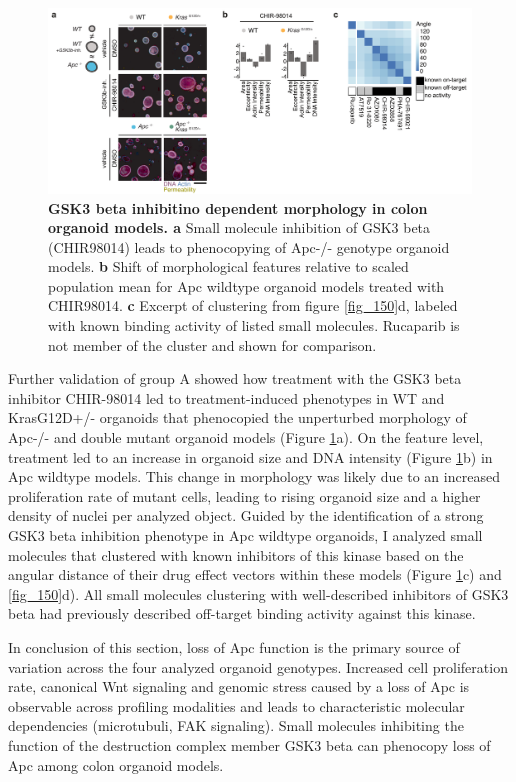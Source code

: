 \begin{flushleft}
\begin{figure}[h]
\centering
\includegraphics[scale=0.75,
                keepaspectratio]{figures/adenomaprofiling/pdf/fig_2_4.pdf}
\caption{\textbf{GSK3 beta inhibitino dependent morphology in colon organoid models. a} Small molecule inhibition of GSK3 beta (CHIR98014) leads to phenocopying of Apc-/- genotype organoid models. \textbf{b} Shift of morphological features relative to scaled population mean for Apc wildtype organoid models treated with CHIR98014. \textbf{c} Excerpt of clustering from figure \ref{fig_150}d, labeled with known binding activity of listed small molecules. Rucaparib is not member of the cluster and shown for comparison.}
\label{fig_185}
\end{figure}
\bigbreak

Further validation of group A showed how treatment with the GSK3 beta inhibitor CHIR-98014 led to treatment-induced phenotypes in WT and KrasG12D+/- organoids that phenocopied the unperturbed morphology of Apc-/- and double mutant organoid models (Figure \ref{fig_185}a). On the feature level, treatment led to an increase in organoid size and DNA intensity (Figure \ref{fig_185}b) in Apc wildtype models. This change in morphology was likely due to an increased proliferation rate of mutant cells, leading to rising organoid size and a higher density of nuclei per analyzed object. Guided by the identification of a strong GSK3 beta inhibition phenotype in Apc wildtype organoids, I analyzed small molecules that clustered with known inhibitors of this kinase based on the angular distance of their drug effect vectors within these models (Figure \ref{fig_185}c) and \ref{fig_150}d). All small molecules clustering with well-described inhibitors of GSK3 beta had previously described off-target binding activity against this kinase.  

\bigbreak

In conclusion of this section, loss of Apc function is the primary source of variation across the four analyzed organoid genotypes. Increased cell proliferation rate, canonical Wnt signaling and genomic stress caused by a loss of Apc is observable across profiling modalities and leads to characteristic molecular dependencies (microtubuli, FAK signaling). Small molecules inhibiting the function of the destruction complex member GSK3 beta can phenocopy loss of Apc among colon organoid models.   


\end{flushleft}
